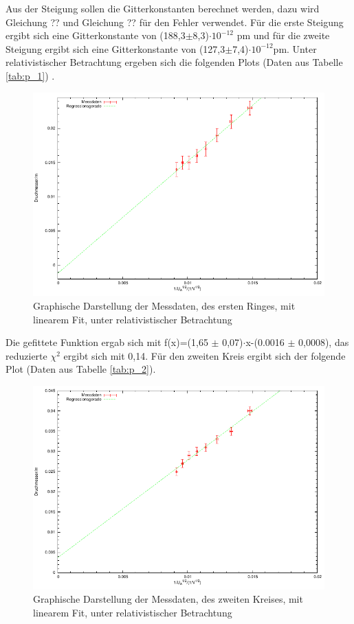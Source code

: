 \documentclass[12pt,a4paper]{article}
\begin{document}
Aus der Steigung sollen die Gitterkonstanten berechnet werden, dazu wird Gleichung ?? und Gleichung ?? für den Fehler verwendet. Für die erste Steigung ergibt sich eine Gitterkonstante von (188,3$\pm$8,3)$\cdot 10^{-12}$ pm und für die zweite Steigung ergibt sich eine Gitterkonstante von (127,3$\pm$7,4)$\cdot 10^{-12}$pm.
\newpage
Unter relativistischer Betrachtung ergeben sich die folgenden Plots (Daten aus Tabelle \ref{tab:p_1}) .
\begin{figure}[H] 
  \centering
    \includegraphics[scale = 1]{kreis_1_r.pdf}
  	\caption[Graphische Darstellung der Messdaten, des ersten Ringes, mit linearem Fit, unter relativistischer Betrachtung]{Graphische Darstellung der Messdaten, des ersten Ringes, mit linearem Fit, unter relativistischer Betrachtung}
  \label{fig:plot_1}
\end{figure}

Die gefittete Funktion ergab sich mit f(x)=(1,65 $\pm$ 0,07)$\cdot$x-(0.0016 $\pm$ 0,0008), das reduzierte $\chi^2$ ergibt sich mit 0,14.
\newpage
Für den zweiten Kreis ergibt sich der folgende Plot (Daten aus Tabelle \ref{tab:p_2}).

\begin{figure}[H] 
  \centering
    \includegraphics[scale = 1]{kreis_2_r.pdf}
  	\caption[Graphische Darstellung der Messdaten, des zweiten Kreises, mit linearem Fit, unter relativistischer Betrachtung]{Graphische Darstellung der Messdaten, des zweiten Kreises, mit linearem Fit, unter relativistischer Betrachtung}
  \label{fig:plot_1}
\end{figure}
\end{document}

